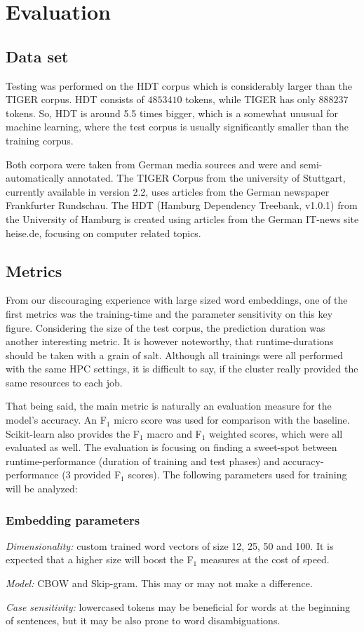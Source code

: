 \documentclass[11pt,a4paper]{article}
\begin{document}
\section{Evaluation}

\subsection{Data set}
Testing was performed on the HDT corpus which is considerably larger than the TIGER corpus. HDT consists of $4853410$ tokens, while TIGER has only $888237$ tokens. So, HDT is around 5.5 times bigger, which is a somewhat unusual for machine learning, where the test corpus is usually significantly smaller than the training corpus.

Both corpora were taken from German media sources and were and semi-automatically annotated. The TIGER Corpus from the university of Stuttgart, currently available in version 2.2, uses articles from the German newspaper Frankfurter Rundschau. The HDT (Hamburg Dependency Treebank, v1.0.1) from the University of Hamburg is created using articles from the German IT-news site heise.de, focusing on computer related topics.


\subsection{Metrics}
From our discouraging experience with large sized word embeddings, one of the first metrics was the training-time and the parameter sensitivity on this key figure. Considering the size of the test corpus, the prediction duration was another interesting metric. It is however noteworthy, that runtime-durations should be taken with a grain of salt. Although all trainings were all performed with the same HPC settings, it is difficult to say, if the cluster really provided the same resources to each job.

That being said, the main metric is naturally an evaluation measure for the model's accuracy. An F$_1$ micro score was used for comparison with the baseline. Scikit-learn also provides the F$_1$ macro and F$_1$ weighted scores, which were all evaluated as well. The evaluation is focusing on finding a sweet-spot between runtime-performance (duration of training and test phases) and accuracy-performance (3 provided F$_1$ scores). The following parameters used for training will be analyzed:

\subsubsection{Embedding parameters}
\begin{itemize*}
	\item \emph{Dimensionality:} custom trained word vectors of size 12, 25, 50 and 100. It is expected that a higher size will boost the F$_1$ measures at the cost of speed.
	\item \emph{Model:} CBOW and Skip-gram. This may or may not make a difference.
	\item \emph{Case sensitivity:} lowercased tokens may be beneficial for words at the beginning of sentences, but it may be also prone to word disambiguations.
\end{itemize*}
\end{document}
